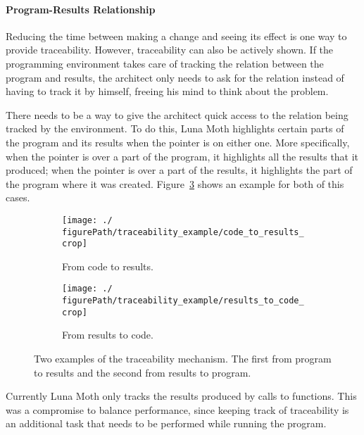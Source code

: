 \paragraph{Program-Results Relationship}
Reducing the time between making a change and seeing its effect is one way to provide traceability.
However, traceability can also be actively shown.
If the programming environment takes care of tracking the relation between the program and results, the architect only needs to ask for the relation instead of having to track it by himself, freeing his mind to think about the problem.

There needs to be a way to give the architect quick access to the relation being tracked by the environment.
To do this, Luna Moth highlights certain parts of the program and  its results when the pointer is on either one.
More specifically, when the pointer is over a part of the program, it highlights all the results that it produced;
when the pointer is over a part of the results, it highlights the part of the program where it was created.
Figure~\ref{fig:trace:example} shows an example for both of this cases.

\begin{figure}
  \centering
  \begin{subfigure}[b]{1.0\linewidth}
    \texttt{[image: ./\\figurePath/traceability\_example/code\_to\_results\_crop]}
    \caption{From code to results.}
    \label{sub:code:to:results}
  \end{subfigure}

  \begin{subfigure}[b]{1.0\linewidth}
    \texttt{[image: ./\\figurePath/traceability\_example/results\_to\_code\_crop]}
    \caption{From results to code.}
    \label{sub:results:to:code}
  \end{subfigure}
  \caption{Two examples of the traceability mechanism. The first from program to results and the second from results to program.}
  \label{fig:trace:example}
\end{figure}

Currently Luna Moth only tracks the results produced by calls to functions.
This was a compromise to balance performance, since keeping track of traceability is an additional task that needs to be performed while running the program.

